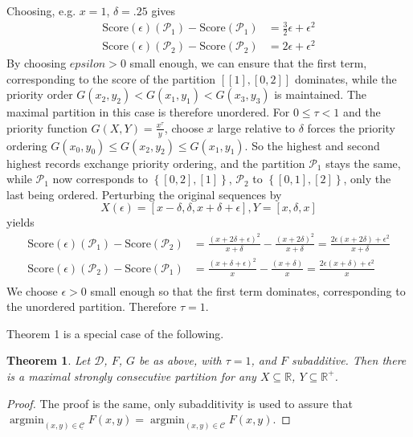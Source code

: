 \documentclass{article}
\newtheorem{thm}{Theorem}
\theoremstyle{case}
\DeclareMathOperator*{\argmin}{argmin} %
\begin{document}
Choosing, e.g. $x = 1$, $\delta = .25$ gives 
\begin{align*}
\text{Score}\left(\epsilon \right)\left(\mathcal{P}_1 \right) - \text{Score}\left(\mathcal{P}_1 \right) &= \frac{3}{2}\epsilon + \epsilon^2 \\
\text{Score}\left(\epsilon \right)\left(\mathcal{P}_2 \right) - \text{Score}\left(\mathcal{P}_2 \right) &= 2\epsilon + \epsilon^2
\end{align*}
By choosing $epsilon > 0$ small enough, we can ensure that the first term, corresponding to the score of the partition $\left[ \left[ 1\right], \left[ 0, 2\right]\right]$ dominates, while the priority order $G(x_2, y_2) < G(x_1, y_1) < G(x_3, y_3)$ is maintained. The maximal partition in this case is therefore unordered.
For $ 0 \leq \tau < 1$ and the priority function $G(X,Y) = \frac{x^{\tau}}{y}$, choose $x$ large relative to $\delta$ forces the priority ordering $G(x_0, y_0) \leq G(x_2, y_2) \leq G(x_1, y_1)$. So the  highest and second highest records exchange priority ordering, and the partition $\mathcal{P}_1$ stays the same, while $\mathcal{P}_1$ now corresponds to $\left\lbrace \left[ 0, 2\right], \left[ 1\right]\right\rbrace$, $\mathcal{P}_2$ to $\left\lbrace \left[ 0, 1\right], \left[ 2\right]\right\rbrace$, only the last being ordered. Perturbing the original sequences by
\[
X\left(\epsilon\right) = \left[ x-\delta, \delta, x + \delta + \epsilon\right], Y = \left[ x, \delta, x\right]
\]
yields
\begin{align*}
\text{Score}\left(\epsilon \right)\left(\mathcal{P}_1 \right) - \text{Score}\left(\mathcal{P}_2 \right) &= \frac{\left( x + 2\delta + \epsilon\right)^2}{x + \delta}  - \frac{\left( x + 2\delta\right)^2}{x + \delta} = \frac{2\epsilon\left( x + 2\delta\right) + \epsilon^2}{x + \delta} \\
\text{Score}\left(\epsilon \right)\left(\mathcal{P}_2 \right) - \text{Score}\left(\mathcal{P}_1 \right) &= \frac{\left( x + \delta + \epsilon\right)^2}{x} - \frac{\left( x + \delta\right)}{x} = \frac{2\epsilon\left( x + \delta \right) + \epsilon^2}{x} \\
\end{align*}
We choose $\epsilon > 0$ small enough so that the first term dominates, corresponding to the unordered partition. Therefore $\tau = 1$.


Theorem 1 is a special case of the following.

\begin{thm} \label{thm1}
Let $\mathcal{D}$, $F$, $G$ be as above, with $\tau = 1$, and $F$ subadditive. Then there is a maximal strongly consecutive partition for any $X \subseteq \mathbb{R}$, $Y \subseteq \mathbb{R}^+$. 
\end{thm}
\begin{proof}
The proof is the same, only subadditivity is used to assure that $\argmin_{(x,y) \in \underline{\mathcal{C}}} F\left( x,y\right) = \argmin_{(x,y) \in \mathcal{C}} F\left( x,y\right)$.
\end{proof}
\end{document}
